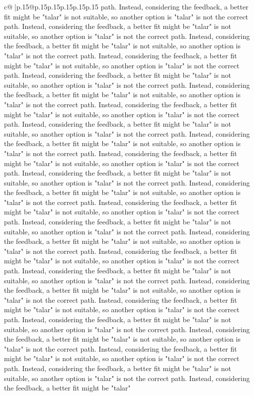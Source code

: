 \documentclass{article}
\begin{document}
{\begin{supertabular}{c@{$\;$}|p{.15\linewidth}@{}p{.15\linewidth}p{.15\linewidth}p{.15\linewidth}p{.15\linewidth}p{.15\linewidth}}
{{{path. Instead, considering the feedback, a better fit might be "talar" is not suitable, so another option is "talar" is not the correct path. Instead, considering the feedback, a better fit might be "talar" is not suitable, so another option is "talar" is not the correct path. Instead, considering the feedback, a better fit might be "talar" is not suitable, so another option is "talar" is not the correct path. Instead, considering the feedback, a better fit might be "talar" is not suitable, so another option is "talar" is not the correct path. Instead, considering the feedback, a better fit might be "talar" is not suitable, so another option is "talar" is not the correct path. Instead, considering the feedback, a better fit might be "talar" is not suitable, so another option is "talar" is not the correct path. Instead, considering the feedback, a better fit might be "talar" is not suitable, so another option is "talar" is not the correct path. Instead, considering the feedback, a better fit might be "talar" is not suitable, so another option is "talar" is not the correct path. Instead, considering the feedback, a better fit might be "talar" is not suitable, so another option is "talar" is not the correct path. Instead, considering the feedback, a better fit might be "talar" is not suitable, so another option is "talar" is not the correct path. Instead, considering the feedback, a better fit might be "talar" is not suitable, so another option is "talar" is not the correct path. Instead, considering the feedback, a better fit might be "talar" is not suitable, so another option is "talar" is not the correct path. Instead, considering the feedback, a better fit might be "talar" is not suitable, so another option is "talar" is not the correct path. Instead, considering the feedback, a better fit might be "talar" is not suitable, so another option is "talar" is not the correct path. Instead, considering the feedback, a better fit might be "talar" is not suitable, so another option is "talar" is not the correct path. Instead, considering the feedback, a better fit might be "talar" is not suitable, so another option is "talar" is not the correct path. Instead, considering the feedback, a better fit might be "talar" is not suitable, so another option is "talar" is not the correct path. Instead, considering the feedback, a better fit might be "talar" is not suitable, so another option is "talar" is not the correct path. Instead, considering the feedback, a better fit might be "talar" is not suitable, so another option is "talar" is not the correct path. Instead, considering the feedback, a better fit might be "talar" is not suitable, so another option is "talar" is not the correct path. Instead, considering the feedback, a better fit might be "talar" is not suitable, so another option is "talar" is not the correct path. Instead, considering the feedback, a better fit might be "talar" is not suitable, so another option is "talar" is not the correct path. Instead, considering the feedback, a better fit might be "talar" is not suitable, so another option is "talar" is not the correct path. Instead, considering the feedback, a better fit might be "talar" }}}
\end{supertabular}}
\end{document}
